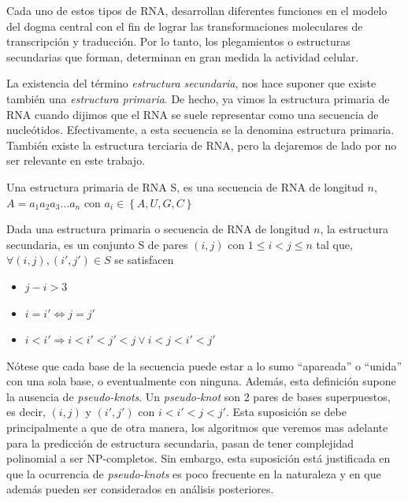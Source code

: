 Cada uno de estos tipos de \ac{RNA}, desarrollan diferentes funciones en el
modelo del dogma central con el fin de lograr las transformaciones moleculares
de transcripci\'on y traducci\'on. Por lo tanto, los plegamientos o estructuras
secundarias que forman, determinan en gran medida la actividad celular.

La existencia del t\'ermino \textit{estructura secundaria}, nos hace suponer que
existe tambi\'en una \textit{estructura primaria}. De hecho, ya vimos la
estructura primaria de \ac{RNA} cuando dijimos que el \ac{RNA} se suele
representar como una secuencia de nucle\'otidos. Efectivamente, a esta secuencia
se la denomina estructura primaria. Tambi\'en existe la estructura terciaria de
\ac{RNA}, pero la dejaremos de lado por no ser relevante en este trabajo.

\begin{definition}
\label{rna_primary}
Una estructura primaria de \ac{RNA} S, es una secuencia de \ac{RNA} de longitud
$n$, $A=a_{1}a_{2}a_{3}\dots a_{n}$ con $a_{i} \in \left\lbrace A, U, G, C
\right\rbrace$ 
\end{definition}

\begin{definition}
\label{rna_secondary}
Dada una estructura primaria o secuencia de \ac{RNA} de longitud $n$, la
estructura secundaria, es un conjunto S de pares $(i,j)$ con $1\leq i < j \leq
n$ tal que, $\forall (i,j), (i',j') \in S$ se satisfacen
\begin{itemize}
 \item $j-i > 3$
 \item $i=i' \Leftrightarrow j=j'$
 \item $i< i'\Rightarrow i < i' < j' < j \lor i < j < i' < j'$ 
\end{itemize}
\end{definition}

N\'otese que cada base de la secuencia puede estar a lo sumo ``apareada'' o
``unida'' con una sola base, o eventualmente con ninguna. Adem\'as, esta
definici\'on supone la ausencia de \textit{pseudo-knots}. Un
\textit{pseudo-knot} son 2 pares de bases superpuestos, es decir, $(i,j)$ y
$(i',j')$ con $i < i' < j < j'$. Esta suposici\'on se debe principalmente a que
de otra manera, los algoritmos que veremos mas adelante para la predicci\'on de
estructura secundaria, pasan de tener complejidad polinomial a ser
NP-completos\cite{Lyngso00}. Sin embargo, esta suposici\'on est\'a justificada
en que la ocurrencia de \textit{pseudo-knots} es poco frecuente en la
naturaleza y en que adem\'as pueden ser considerados en an\'alisis
posteriores\cite{Zuker84}.

